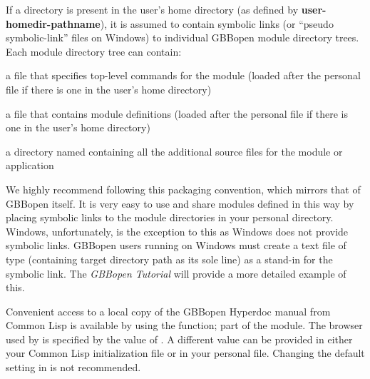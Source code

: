 \documentclass[10pt,twoside,english,pdftex]{article}
\begin{document}
If a  directory is present in the user's home
directory (as defined by \textbf{user-homedir-pathname}), it is
assumed to contain symbolic links (or ``pseudo symbolic-link'' files on
Windows) to individual GBBopen module directory trees.  Each module
directory tree can contain:

\begin{tightitemize}
\item a  file that specifies top-level commands for the
  module (loaded after the personal  file
  if there is one in the user's home directory)
\item a  file that contains module definitions (loaded
  after the personal  file if there is one in the
  user's home directory)
\item a directory named  containing all the additional source
  files for the module or application
\end{tightitemize}

We highly recommend following this packaging convention, which mirrors
that of GBBopen itself. It is very easy to use and share modules
defined in this way by placing symbolic links to the module
directories in your personal  directory.
Windows, unfortunately, is the exception to this as Windows does not
provide symbolic links.  GBBopen users running on Windows must create
a text file of type  (containing target directory path as
its sole line) as a stand-in for the symbolic link.  The
\textit{GBBopen Tutorial} will provide a more detailed example of
this.

\label{sec:hyperdoc}
%
%
%
%
%
%
%
%
%
%
%

Convenient access to a local copy of the GBBopen Hyperdoc manual from Common
Lisp is available by using the \textbf{} function;
part of the  module. The
browser used by \textbf{} is specified by the value
of .  A different value can be provided in
either your Common Lisp initialization file or in your personal
 file.  Changing the default setting in
 is not recommended.
\end{document}
